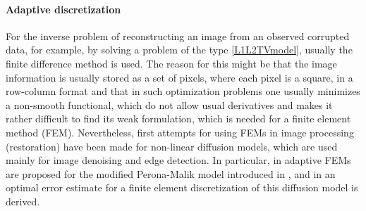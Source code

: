 \documentclass[enabledeprecatedfontcommands,cleardoublepage=empty,headsepline,twoside,11pt,DIV=15,BCOR=12mm,final]{scrartcl}
\begin{document}


\paragraph{Adaptive discretization}
For the inverse problem of reconstructing an image from an observed corrupted data, for example, by solving a problem of the type \eqref{L1L2TVmodel}, usually the finite difference method is used. The reason for this might be that the image information is usually stored as a set of pixels, where each pixel is a square, in a row-column format and that in such optimization problems one usually minimizes a non-smooth functional, which do not allow usual derivatives and makes it rather difficult to find its weak formulation, which is needed for a finite element method (FEM). Nevertheless, first attempts for using FEMs in image processing (restoration) have been made for non-linear diffusion models, which are used mainly for image denoising and edge detection. In particular, in \cite{BazBlo, BaeMik, PreRum} adaptive FEMs are proposed for the modified Perona-Malik model introduced in \cite{CatLioMorCol}, and in \cite{Li} an optimal error estimate for a finite element discretization of this diffusion model is derived.
\end{document}
